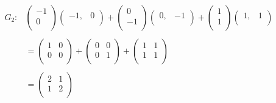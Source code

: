 \documentclass[11pt,a4paper]{article}
\theoremstyle{definition}
\begin{document}
\begin{align*}
G_2: & \begin{pmatrix}
-1\\0\\
\end{pmatrix}
\begin{pmatrix}
-1, & 0\\
\end{pmatrix} + \begin{pmatrix}
0\\ -1\\
\end{pmatrix}
\begin{pmatrix}
0, & -1\\
\end{pmatrix} + \begin{pmatrix}
1\\1\\
\end{pmatrix}
\begin{pmatrix}
1, & 1\\
\end{pmatrix}\\\\
& =\begin{pmatrix}
1 & 0\\
0 & 0\\
\end{pmatrix} + \begin{pmatrix}
0 & 0\\
0 & 1\\
\end{pmatrix} + \begin{pmatrix}
1 & 1\\
1 & 1\\
\end{pmatrix}\\\\
& = \begin{pmatrix}
2 & 1\\
1 & 2\\
\end{pmatrix}\\
\end{align*}
\end{document}
